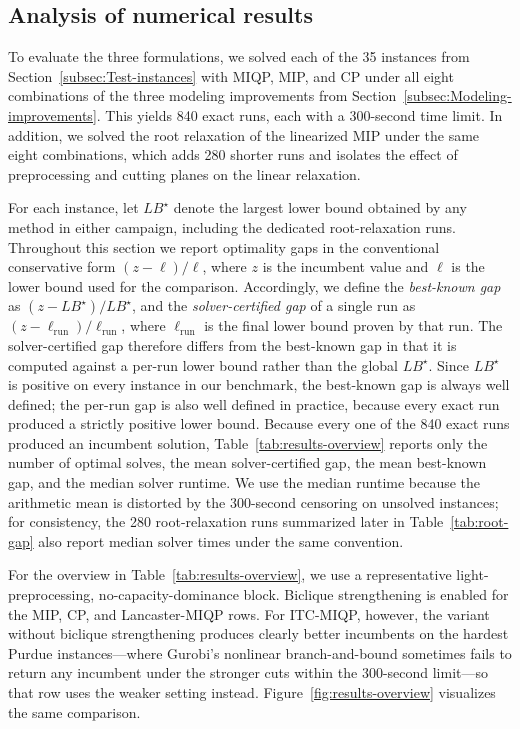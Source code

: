 \documentclass[11pt]{article}
\begin{document}
\subsection{Analysis of numerical results}
\label{subsec:Analysis-results}

To evaluate the three formulations, we solved each of the 35 instances from Section~\ref{subsec:Test-instances} with MIQP, MIP, and CP under all eight combinations of the three modeling improvements from Section~\ref{subsec:Modeling-improvements}. This yields 840 exact runs, each with a 300-second time limit. In addition, we solved the root relaxation of the linearized MIP under the same eight combinations, which adds 280 shorter runs and isolates the effect of preprocessing and cutting planes on the linear relaxation.

For each instance, let $LB^\star$ denote the largest lower bound obtained by any method in either campaign, including the dedicated root-relaxation runs. Throughout this section we report optimality gaps in the conventional conservative form $(z-\ell)/\ell$, where $z$ is the incumbent value and $\ell$ is the lower bound used for the comparison. Accordingly, we define the \emph{best-known gap} as $(z-LB^\star)/LB^\star$, and the \emph{solver-certified gap} of a single run as $(z-\ell_{\text{run}})/\ell_{\text{run}}$, where $\ell_{\text{run}}$ is the final lower bound proven by that run. The solver-certified gap therefore differs from the best-known gap in that it is computed against a per-run lower bound rather than the global $LB^\star$. Since $LB^\star$ is positive on every instance in our benchmark, the best-known gap is always well defined; the per-run gap is also well defined in practice, because every exact run produced a strictly positive lower bound. Because every one of the 840 exact runs produced an incumbent solution, Table~\ref{tab:results-overview} reports only the number of optimal solves, the mean solver-certified gap, the mean best-known gap, and the median solver runtime. We use the median runtime because the arithmetic mean is distorted by the 300-second censoring on unsolved instances; for consistency, the 280 root-relaxation runs summarized later in Table~\ref{tab:root-gap} also report median solver times under the same convention.

For the overview in Table~\ref{tab:results-overview}, we use a representative light-preprocessing, no-capacity-dominance block. Biclique strengthening is enabled for the MIP, CP, and Lancaster-MIQP rows. For ITC-MIQP, however, the variant without biclique strengthening produces clearly better incumbents on the hardest Purdue instances---where Gurobi's nonlinear branch-and-bound sometimes fails to return any incumbent under the stronger cuts within the 300-second limit---so that row uses the weaker setting instead. Figure~\ref{fig:results-overview} visualizes the same comparison.
\end{document}
